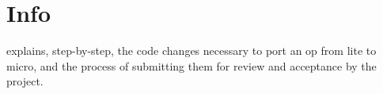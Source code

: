 \chapter{Info}
\hypertarget{md__arduino_2_get_started_with_machine_learning_on_arduino_2tflite-micro-main_2tensorflow_2lite_2micro_2kernels_2_r_e_a_d_m_e}{}\label{md__arduino_2_get_started_with_machine_learning_on_arduino_2tflite-micro-main_2tensorflow_2lite_2micro_2kernels_2_r_e_a_d_m_e}
\label{md__arduino_2_get_started_with_machine_learning_on_arduino_2tflite-micro-main_2tensorflow_2lite_2micro_2kernels_2_r_e_a_d_m_e_autotoc_md335}%
%



\begin{DoxyItemize}
\item {} explains, step-\/by-\/step, the code changes necessary to port an op from lite to micro, and the process of submitting them for review and acceptance by the project. 
\end{DoxyItemize}
